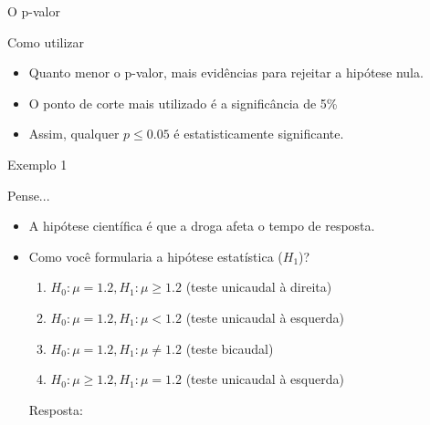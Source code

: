 \documentclass{beamer}
\begin{document}
\begin{frame}{\scriptsize O p-valor}
  \begin{block}{Como utilizar}
    \footnotesize
    \begin{itemize}
      \footnotesize
    \item Quanto menor o p-valor, mais evidências para rejeitar a
      hipótese nula.
    \item O ponto de corte mais utilizado é a significância de 5\%
    \item Assim, qualquer $p \le 0.05$ é estatisticamente significante.
    \end{itemize}
  \end{block}
\end{frame}



\begin{frame}{\scriptsize Exemplo 1}
  \begin{block}{Pense...}
    \footnotesize
    \begin{itemize}
      \footnotesize
    \item A hipótese científica é que a droga afeta o tempo de resposta.
    \item Como você formularia a hipótese estatística ($H_1$)?
      \begin{enumerate}
        \footnotesize
      \item $H_0: \mu = 1.2, H_1: \mu \ge 1.2$ (teste unicaudal à direita)
      \item $H_0: \mu = 1.2, H_1: \mu < 1.2$ (teste unicaudal à esquerda)
      \item \alert<2>{$H_0: \mu = 1.2, H_1: \mu \ne 1.2$ (teste bicaudal)}
      \item $H_0: \mu \ge 1.2, H_1: \mu = 1.2$ (teste unicaudal à esquerda)
      \end{enumerate}

      Resposta: 
    \end{itemize}
  \end{block}
\end{frame}
\end{document}
